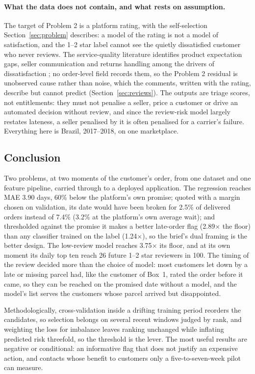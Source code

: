 \paragraph{What the data does not contain, and what rests on assumption.}
The target of Problem 2 is a platform rating, with the self-selection
Section~\ref{sec:problem} describes: a model of the rating is not a model of
satisfaction, and the 1--2 star label cannot see the quietly dissatisfied
customer who never reviews. The service-quality literature identifies product
expectation gaps, seller communication and returns handling among the drivers of
dissatisfaction \citep{parasuraman2005esqual, rao2011elsq}; no order-level field
records them, so the Problem 2 residual is unobserved cause rather than noise,
which the comments, written with the rating, describe but cannot predict
(Section~\ref{sec:reviews}). The outputs are triage scores, not entitlements:
they must not penalise a seller, price a customer or drive an automated decision
without review, and since the review-risk model largely restates lateness, a
seller penalised by it is often penalised for a carrier's failure. Everything
here is Brazil, 2017--2018, on one marketplace.

\subsection*{Conclusion}

Two problems, at two moments of the customer's order, from one dataset and one
feature pipeline, carried through to a deployed application. The regression
reaches MAE 3.90 days, 60\% below the platform's own promise; quoted with a margin
chosen on validation, its date would have been broken for 2.5\% of delivered
orders instead of 7.4\% (3.2\% at the platform's own average wait); and thresholded against the promise it makes a better
late-order flag (2.89$\times$ the floor) than any classifier trained on the label
(1.24$\times$), so the brief's dual framing is the better design. The
low-review model reaches 3.75$\times$ its floor, and at its own moment its
daily top ten reach 26 future 1--2 star reviewers in 100. The timing of the
review decided more than the choice of model: most customers let down by a late
or missing parcel had, like the customer of Box~1, rated the order before it came, so they can be reached on the
promised date without a model, and the model's list serves the customers whose
parcel arrived but disappointed.

Methodologically, cross-validation inside a drifting training period reorders the
candidates, so selection belongs on several recent windows judged by rank, and
weighting the loss for imbalance leaves ranking unchanged while inflating
predicted risk threefold, so the threshold is the lever. The most useful results
are negative or conditional: an informative flag that does not justify an
expensive action, and contacts whose benefit to customers only a
five-to-seven-week pilot can measure.
